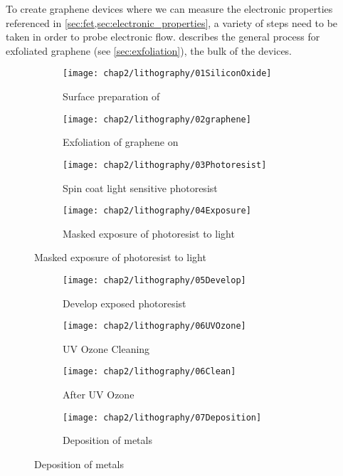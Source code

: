 \documentclass[../../Matt_Gebert_Honours_Thesis.tex]{subfiles}
\begin{document}
	To create graphene devices where we can measure the electronic properties referenced in \cref{sec:fet,sec:electronic_properties}, a variety of steps need to be taken in order to probe electronic flow.  describes the general process for exfoliated graphene (see \cref{sec:exfoliation}), the bulk of the devices.
	
	\begin{figure}[H]
	\centering
	\begin{subfigure}{0.2\textwidth}
		\centering
		\texttt{[image: chap2/lithography/01SiliconOxide]}
		\caption{Surface preparation of \silicondioxide}
	\end{subfigure}
	\hspace{0.04\textwidth}
	\begin{subfigure}{0.2\textwidth}
		\centering
		\texttt{[image: chap2/lithography/02graphene]}
		\caption{Exfoliation of graphene on \silicondioxide}
	\end{subfigure}
	\hspace{0.04\textwidth}
	\begin{subfigure}{0.2\textwidth}
		\centering
		\texttt{[image: chap2/lithography/03Photoresist]}
		\caption{Spin coat light sensitive photoresist}
	\end{subfigure}
	\hspace{0.04\textwidth}
	\begin{subfigure}{0.2\textwidth}
		\centering
		\texttt{[image: chap2/lithography/04Exposure]}
		\caption{Masked exposure of photoresist to light}
	\end{subfigure}
	\end{figure}
	\begin{figure}[H]
	\centering
	\ContinuedFloat
	\begin{subfigure}{0.2\textwidth}
		\centering
		\texttt{[image: chap2/lithography/05Develop]}
		\caption{Develop exposed photoresist}
	\end{subfigure}
	\hspace{0.04\textwidth}
	\begin{subfigure}{0.2\textwidth}
		\centering
		\texttt{[image: chap2/lithography/06UVOzone]}
		\caption{UV Ozone Cleaning}
	\end{subfigure}
	\hspace{0.04\textwidth}
	\begin{subfigure}{0.2\textwidth}
		\centering
		\texttt{[image: chap2/lithography/06Clean]}
		\caption{After UV Ozone}
	\end{subfigure}
	\hspace{0.04\textwidth}
	\begin{subfigure}{0.2\textwidth}
		\centering
		\texttt{[image: chap2/lithography/07Deposition]}
		\caption{Deposition of metals}
	\end{subfigure}
	\end{figure}
\end{document}
